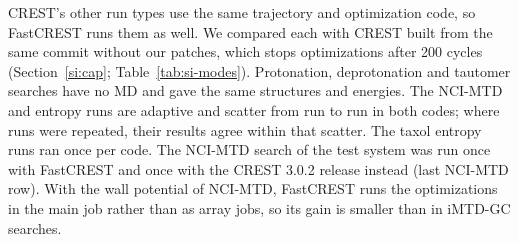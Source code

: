 \documentclass[journal=jctcce,manuscript=suppinfo]{achemso}
\begin{document}
CREST's other run types use the same trajectory and optimization code, so FastCREST runs them as well. We compared each with CREST built from the same commit without our patches, which stops optimizations after 200 cycles (Section~\ref{si:cap}; Table~\ref{tab:si-modes}). Protonation, deprotonation and tautomer
searches have no MD and gave the same structures and energies. The NCI-MTD and entropy runs are adaptive and scatter
from run to run in both codes; where runs were repeated, their results agree within that scatter. The taxol entropy runs ran once per code. The NCI-MTD search of the test system was run once with FastCREST and once with the CREST 3.0.2 release instead (last NCI-MTD row). With the wall potential of NCI-MTD, FastCREST
runs the optimizations in the main job rather than as array jobs, so its gain is smaller than in iMTD-GC searches.
\end{document}
